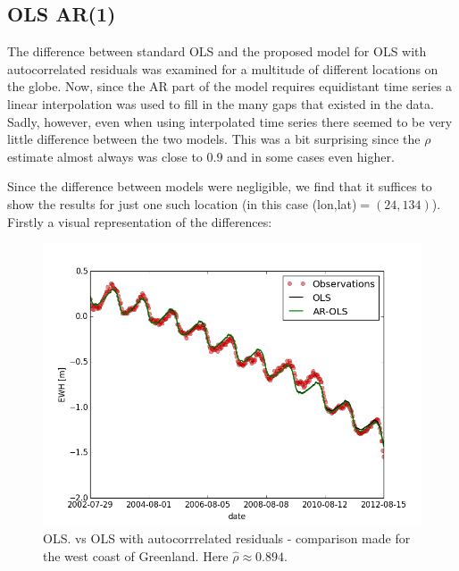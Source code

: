 
\subsection{OLS AR(1)}
The difference between standard OLS and the proposed model for OLS with autocorrelated residuals was examined for a multitude of different locations on the globe.
Now, since the AR part of the model requires equidistant time series a linear interpolation was used to fill in the many gaps that existed in the data. 
Sadly, however, even when using interpolated time series there seemed to be very little difference between the two models. This was a bit surprising since the $\rho$ estimate almost always was close to $0.9$ and in some cases even higher. 

Since the difference between models were negligible, we find that it suffices to show the results for just one such location (in this case (lon,lat)$=(24,134)$).
Firstly a visual representation of the differences:

\begin{figure}[H]
\centering
\includegraphics[width=1.0\linewidth]{figures/ols-AR(1)-24-134}
\caption{OLS. vs OLS with autocorrrelated residuals - comparison made for the west coast of Greenland. Here $\hat{\rho}\approx0.894$.}
\end{figure}

